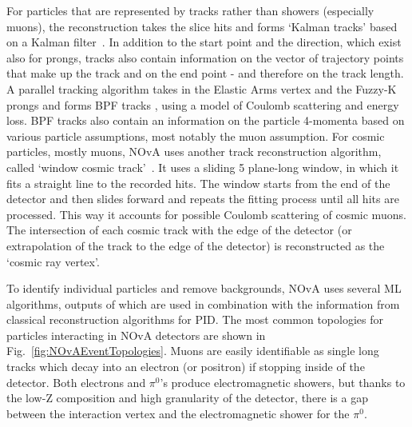 For particles that are represented by tracks rather than showers (especially muons), the reconstruction takes the slice hits and forms `Kalman tracks' based on a Kalman filter~\cite{RaddatzNOvAThesis_KalmanTracks.pdf}. In addition to the start point and the direction, which exist also for prongs, tracks also contain information on the vector of trajectory points that make up the track and on the end point - and therefore on the track length. A parallel tracking algorithm takes in the Elastic Arms vertex and the Fuzzy-K prongs and forms \gls{BPF} tracks \cite{BairdNOvAThesis_BPFTracks.pdf,BreakPointFitterBasics.pdf}, using a model of Coulomb scattering and energy loss. \gls{BPF} tracks also contain an information on the particle 4-momenta based on various particle assumptions, most notably the muon assumption. For cosmic particles, mostly muons, \gls{NOvA} uses another track reconstruction algorithm, called `window cosmic track'~\cite{NOvA-doc-15977}. It uses a sliding 5 plane-long window, in which it fits a straight line to the recorded hits. The window starts from the end of the detector and then slides forward and repeats the fitting process until all hits are processed. This way it accounts for possible Coulomb scattering of cosmic muons. The intersection of each cosmic track with the edge of the detector (or extrapolation of the track to the edge of the detector) is reconstructed as the `cosmic ray vertex'.

To identify individual particles and remove backgrounds, \gls{NOvA} uses several \gls{ML} algorithms, outputs of which are used in combination with the information from classical reconstruction algorithms for \gls{PID}. The most common topologies for particles interacting in \gls{NOvA} detectors are shown in Fig.~\ref{fig:NOvAEventTopologies}. Muons are easily identifiable as single long tracks which decay into an electron (or positron) if stopping inside of the detector. Both electrons and $\pi^0$'s produce electromagnetic showers, but thanks to the low-Z composition and high granularity of the detector, there is a gap between the interaction vertex and the electromagnetic shower for the $\pi^0$.


